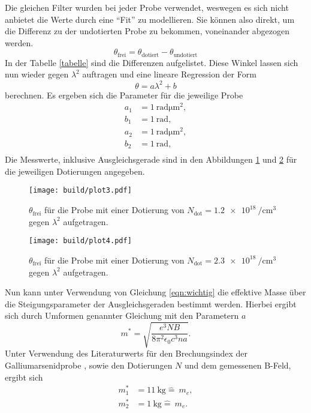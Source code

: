 Die gleichen Filter wurden bei jeder Probe verwendet, weswegen es sich nicht anbietet die Werte durch eine \enquote{Fit} zu modellieren.
Sie können also direkt, um die Differenz zu der undotierten Probe zu bekommen, voneinander abgezogen werden.
\begin{equation}
\theta_{\text{frei}} = \theta_{\text{dotiert}} - \theta_{\text{undotiert}}
\end{equation}
In der Tabelle \ref{tabelle} sind die Differenzen aufgelistet. Diese Winkel lassen sich nun wieder gegen $\lambda^2$ auftragen und eine lineare Regression
der Form
\begin{equation}
\theta = a \lambda^2 + b
\end{equation}
berechnen.
Es ergeben sich die Parameter für die jeweilige Probe
\begin{align*}
a_{1} &= \SI{1}{\radian\micro\meter\squared},\\
b_{1} &= \SI{1}{\radian}, \\
a_{2} &= \SI{1}{\radian\micro\meter\squared},\\
b_{2} &= \SI{1}{\radian}, \\
\end{align*}
Die Messwerte, inklusive Ausgleichsgerade sind in den Abbildungen \ref{plt1} und \ref{plt2} für die jeweiligen Dotierungen angegeben.
\begin{figure}
    \centering
    \texttt{[image: build/plot3.pdf]}
    \caption{$\theta_{\text{frei}}$ für die Probe mit einer Dotierung von $N_{\text{dot}}=\SI{1.2e18}{\per\centi\meter^3}$ gegen $\lambda^2$ aufgetragen.}
    \label{plt1}
\end{figure}
\begin{figure}
    \centering
    \texttt{[image: build/plot4.pdf]}
    \caption{$\theta_{\text{frei}}$ für die Probe mit einer Dotierung von $N_{\text{dot}}=\SI{2.3e18}{\per\centi\meter^3}$ gegen $\lambda^2$ aufgetragen.}
    \label{plt2}
\end{figure}
Nun kann unter Verwendung von Gleichung \eqref{eqn:wichtig} die effektive Masse über die Steigungsparameter der Ausgleichsgeraden bestimmt werden.
Hierbei ergibt sich durch Umformen genannter Gleichung mit den Parametern $a$
\begin{equation}
m^{*} = \sqrt{\frac{e^3 NB}{8 \pi^2 \epsilon_0 c^3 n a}}.
\end{equation}
Unter Verwendung des Literaturwerts für den Brechungsindex der Galliumarsenidprobe \cite{GaAs}, sowie den Dotierungen $N$ und dem gemessenen B-Feld, ergibt sich
\begin{align}
m_1^{*} &= \SI{11}{\kilo\gram} \hat{=} \SI{}{}m_e,\\
m_2^{*} &= \SI{1}{\kilo\gram} \hat{=} \SI{}{}m_e.
\end{align}
